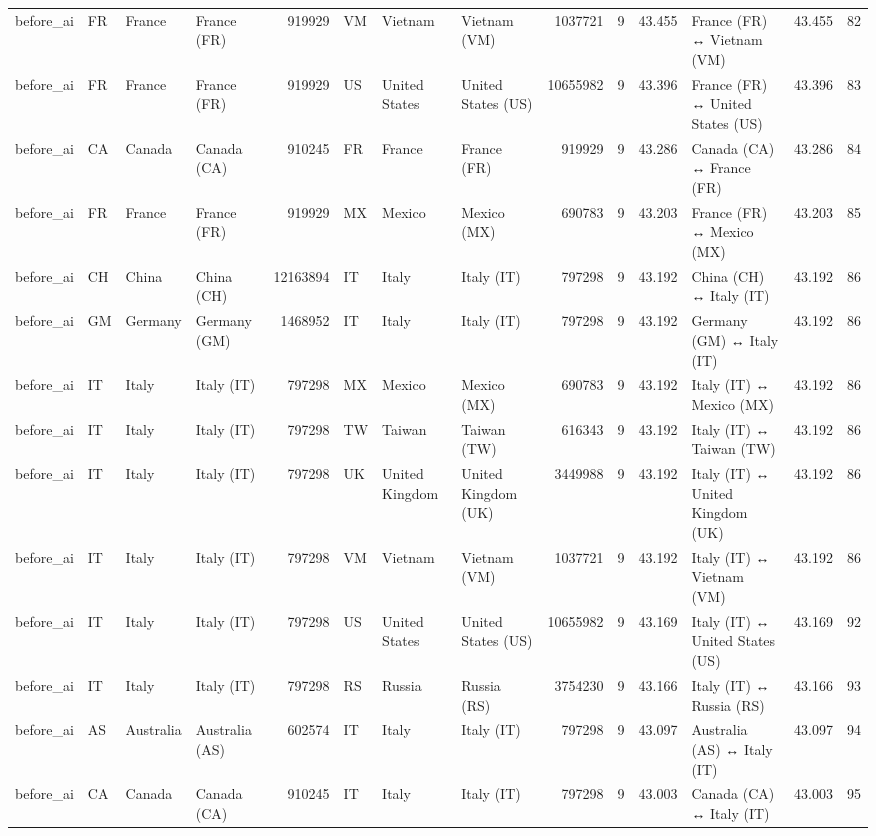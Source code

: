 \begin{tabular}{llllrlllrrrlrr}
before\_ai & FR & France & France (FR) & 919929 & VM & Vietnam & Vietnam (VM) & 1037721 & 9 & 43.455 & France (FR) ↔ Vietnam (VM) & 43.455 & 82 \\
before\_ai & FR & France & France (FR) & 919929 & US & United States & United States (US) & 10655982 & 9 & 43.396 & France (FR) ↔ United States (US) & 43.396 & 83 \\
before\_ai & CA & Canada & Canada (CA) & 910245 & FR & France & France (FR) & 919929 & 9 & 43.286 & Canada (CA) ↔ France (FR) & 43.286 & 84 \\
before\_ai & FR & France & France (FR) & 919929 & MX & Mexico & Mexico (MX) & 690783 & 9 & 43.203 & France (FR) ↔ Mexico (MX) & 43.203 & 85 \\
before\_ai & CH & China & China (CH) & 12163894 & IT & Italy & Italy (IT) & 797298 & 9 & 43.192 & China (CH) ↔ Italy (IT) & 43.192 & 86 \\
before\_ai & GM & Germany & Germany (GM) & 1468952 & IT & Italy & Italy (IT) & 797298 & 9 & 43.192 & Germany (GM) ↔ Italy (IT) & 43.192 & 86 \\
before\_ai & IT & Italy & Italy (IT) & 797298 & MX & Mexico & Mexico (MX) & 690783 & 9 & 43.192 & Italy (IT) ↔ Mexico (MX) & 43.192 & 86 \\
before\_ai & IT & Italy & Italy (IT) & 797298 & TW & Taiwan & Taiwan (TW) & 616343 & 9 & 43.192 & Italy (IT) ↔ Taiwan (TW) & 43.192 & 86 \\
before\_ai & IT & Italy & Italy (IT) & 797298 & UK & United Kingdom & United Kingdom (UK) & 3449988 & 9 & 43.192 & Italy (IT) ↔ United Kingdom (UK) & 43.192 & 86 \\
before\_ai & IT & Italy & Italy (IT) & 797298 & VM & Vietnam & Vietnam (VM) & 1037721 & 9 & 43.192 & Italy (IT) ↔ Vietnam (VM) & 43.192 & 86 \\
before\_ai & IT & Italy & Italy (IT) & 797298 & US & United States & United States (US) & 10655982 & 9 & 43.169 & Italy (IT) ↔ United States (US) & 43.169 & 92 \\
before\_ai & IT & Italy & Italy (IT) & 797298 & RS & Russia & Russia (RS) & 3754230 & 9 & 43.166 & Italy (IT) ↔ Russia (RS) & 43.166 & 93 \\
before\_ai & AS & Australia & Australia (AS) & 602574 & IT & Italy & Italy (IT) & 797298 & 9 & 43.097 & Australia (AS) ↔ Italy (IT) & 43.097 & 94 \\
before\_ai & CA & Canada & Canada (CA) & 910245 & IT & Italy & Italy (IT) & 797298 & 9 & 43.003 & Canada (CA) ↔ Italy (IT) & 43.003 & 95 \\

\end{tabular}
